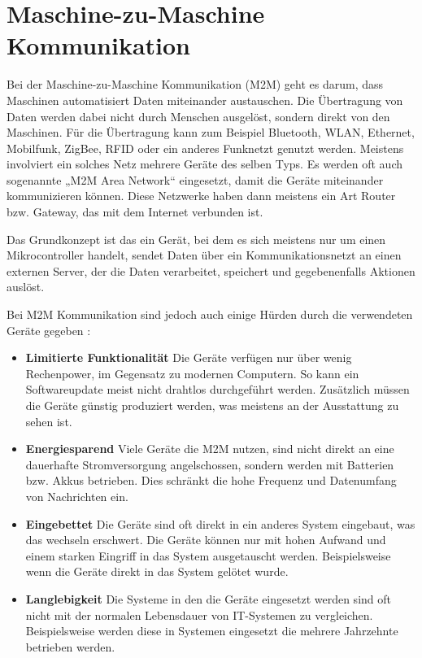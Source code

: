 \section{Maschine-zu-Maschine Kommunikation}
\label{sec:m2m}
Bei der Maschine-zu-Maschine Kommunikation (\ac{M2M}) geht es darum, dass Maschinen automatisiert Daten miteinander austauschen. Die Übertragung von Daten werden dabei nicht durch Menschen ausgelöst, sondern direkt von den Maschinen. Für die Übertragung kann zum Beispiel Bluetooth, WLAN, Ethernet, Mobilfunk, ZigBee, RFID oder ein anderes Funknetzt genutzt werden.  Meistens involviert ein solches Netz mehrere Geräte des selben Typs. Es werden oft auch sogenannte „M2M Area Network“ eingesetzt, damit die Geräte miteinander kommunizieren können. Diese Netzwerke haben dann meistens ein Art Router bzw. Gateway, das mit dem Internet verbunden ist.  

Das Grundkonzept ist das ein Gerät, bei dem es sich meistens nur um einen Mikrocontroller handelt, sendet Daten über ein Kommunikationsnetzt an einen externen Server, der die Daten verarbeitet, speichert und gegebenenfalls Aktionen auslöst.

Bei M2M Kommunikation sind jedoch auch einige Hürden durch die verwendeten Geräte gegeben \cite[S. 4f]{boswarthick2012m2m}: 
\begin{itemize}
	\item \textbf{Limitierte  Funktionalität} Die Geräte verfügen nur über wenig Rechenpower, im Gegensatz zu modernen Computern. So kann ein Softwareupdate meist nicht drahtlos durchgeführt werden. Zusätzlich müssen die Geräte günstig produziert werden, was meistens an der Ausstattung zu sehen ist. 
	\item \textbf{Energiesparend } Viele Geräte die M2M nutzen, sind nicht direkt an eine dauerhafte Stromversorgung angelschossen, sondern werden mit Batterien bzw. Akkus betrieben. Dies schränkt die hohe Frequenz und Datenumfang von Nachrichten ein. 
	\item \textbf{Eingebettet } Die Geräte sind oft direkt in ein anderes System eingebaut, was das wechseln erschwert. Die Geräte können nur mit hohen Aufwand und einem starken Eingriff in das System ausgetauscht werden. Beispielsweise wenn die Geräte direkt in das System gelötet wurde.
	\item \textbf{Langlebigkeit } Die Systeme in den die Geräte eingesetzt werden sind oft nicht mit der normalen Lebensdauer von IT-Systemen zu vergleichen. Beispielsweise werden diese in Systemen eingesetzt die mehrere Jahrzehnte betrieben werden. 
\end{itemize}

